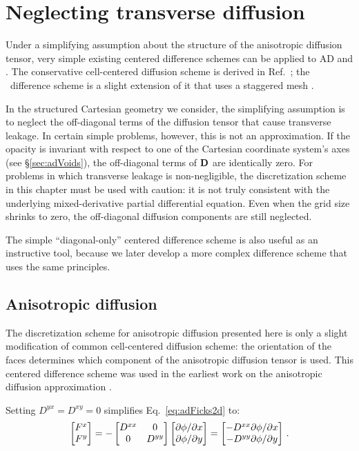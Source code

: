 \section{Neglecting transverse diffusion}\label{sec:discreteDiag}

Under a simplifying assumption about the structure of the anisotropic diffusion
tensor, very simple existing centered difference schemes can be
applied to AD and \APone. The conservative cell-centered diffusion scheme is
derived in Ref.~\cite{Dud1976}; the \APone\ difference scheme is a slight extension
of it that uses a staggered mesh \cite{War2003}.

In the structured Cartesian geometry we consider, the simplifying assumption is
to neglect the off-diagonal terms of the diffusion tensor that cause transverse
leakage.
In certain simple problems, however, this is not an approximation. If the
opacity is invariant with respect to one of the Cartesian coordinate system's
axes (see \S\ref{sec:adVoids}), the off-diagonal terms of $\mathbf{D}$ are
identically zero. For problems in which transverse leakage is non-negligible,
the discretization scheme in this chapter must be used with caution: it is not
truly consistent with the underlying mixed-derivative partial differential
equation. Even when the grid size shrinks to zero, the off-diagonal diffusion
components are still neglected.

The simple ``diagonal-only'' centered difference scheme is also useful as an
instructive tool, because we later develop a more complex difference scheme that
uses the same principles.

\subsection{Anisotropic diffusion}
The discretization scheme for anisotropic diffusion presented here is only a
slight modification of common cell-centered diffusion scheme: the
orientation of the faces determines which component of the anisotropic diffusion
tensor is used.  This centered difference scheme was used in the earliest work
on the anisotropic diffusion approximation \cite{Lar2009c}.

Setting $D^{yx}=D^{xy}=0$ simplifies Eq.~\eqref{eq:adFicks2d} to:
\begin{equation*}
  \begin{bmatrix}
    F^{x} \\
    F^{y}
  \end{bmatrix}
  = -
  \begin{bmatrix}
    D^{xx} & 0 \\
    0 & D^{yy}
  \end{bmatrix}
  \begin{bmatrix}
    {\partial \phi}/{\partial x} \\
    {\partial \phi}/{\partial y}
  \end{bmatrix}
  = 
  \begin{bmatrix}
    - D^{xx} {\partial \phi}/{\partial x} \\
    - D^{yy} {\partial \phi}/{\partial y}
  \end{bmatrix}
  \,.
\end{equation*}

